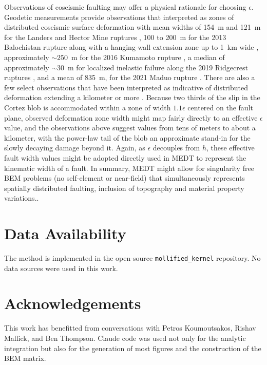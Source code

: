 \documentclass[12pt]{article}
\newcommand{\eps}{\epsilon}
\begin{document}
Observations of coseismic faulting may offer a physical rationale for choosing $\eps$.  Geodetic measurements provide observations that interpreted as zones of distributed coseismic surface deformation with mean widths of 154~m and 121~m for the Landers and Hector Mine ruptures \citep{Milliner2015, Milliner2016}, 100 to 200~m for the 2013 Balochistan rupture \citep{Cheng2021} along with a hanging-wall extension zone up to 1~km wide \citep{Vallage2015, Gold2015}, approximately ${\sim}250$~m for the 2016 Kumamoto rupture \citep{Scott2018}, a median of approximately ${\sim}30$~m for localized inelastic failure along the 2019 Ridgecrest ruptures \citep{Barnhart2020, Antoine2021, Xu2020}, and a mean of 835~m, for the 2021 Maduo rupture \citep{Li2023}.  There are also a few select observations that have been interpreted as indicative of distributed deformation extending a kilometer \citep{Fialko2002, Cochran2009} or more \citep{RodriguezPadilla2022, Liu2025}.  Because two thirds of the slip in the Cortez blob is accommodated within a zone of width $1.1\eps$ centered on the fault plane, observed deformation zone width might map fairly directly to an effective $\eps$ value, and the observations above suggest values from tens of meters to about a kilometer, with the power-law tail of the blob an approximate stand-in for the slowly decaying damage beyond it. Again, as $\eps$ decouples from $h$, these effective fault width values might be adopted directly used in MEDT to represent the kinematic width of a fault.  In summary, MEDT might allow for singularity free BEM problems (no self-element or near-field) that simultaneously represents spatially distributed faulting, inclusion of topography and material property variations..


\clearpage
\section*{Data Availability}
The method is implemented in the open-source \texttt{mollified\_kernel} repository.  No data sources were used in this work.


\clearpage
\section*{Acknowledgements}
This work has benefitted from conversations with Petros Koumoutsakos, Rishav Mallick, and Ben Thompson.  Claude code was used not only for the analytic integration but also for the generation of most figures and the construction of the BEM matrix.
\end{document}
